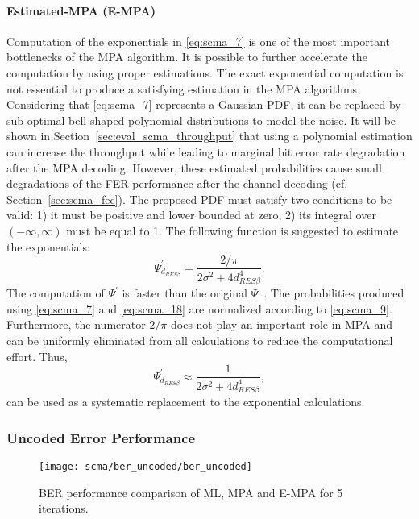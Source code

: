 \paragraph{Estimated-MPA (E-MPA)}

Computation of the exponentials in \eqref{eq:scma_7} is one of the most
important bottlenecks of the MPA algorithm. It is possible to further accelerate
the computation by using proper estimations. The exact exponential computation
is not essential to produce a satisfying estimation in the MPA algorithms.
Considering that \eqref{eq:scma_7} represents a Gaussian PDF, it can be replaced
by sub-optimal bell-shaped polynomial distributions to model the noise. It will
be shown in Section~\ref{sec:eval_scma_throughput} that using a
polynomial estimation can increase the throughput while leading to marginal bit
error rate degradation after the MPA decoding. However, these estimated
probabilities cause small degradations of the FER performance after the channel
decoding (cf. Section~\ref{sec:scma_fec}). The proposed PDF must satisfy two
conditions to be valid: 1) it must be positive and lower bounded at zero, 2) its
integral over $(-\infty, \infty)$ must be equal to 1. The following function is
suggested to estimate the exponentials:
\begin{equation}
  \label{eq:scma_18}
  \Psi^{'}_{d_{RES \beta}} = \frac{2 / \pi}{2\sigma^2 + 4d^4_{RES \beta}}.
\end{equation}
The computation of $\Psi^{'}$ is faster than the original
$\Psi$~\cite{Ghaffari2017}. The probabilities produced using \eqref{eq:scma_7}
and \eqref{eq:scma_18} are normalized according to \eqref{eq:scma_9}.
Furthermore, the numerator $2/\pi$ does not play an important role in MPA and
can be uniformly eliminated from all calculations to reduce the computational
effort. Thus,
\begin{equation}
  \label{eq:scma_19}
  \Psi^{'}_{d_{RES \beta}} \approx \frac{1}{2\sigma^2 + 4d^4_{RES \beta}},
\end{equation}
can be used as a systematic replacement to the exponential calculations.

\subsubsection{Uncoded Error Performance}
\label{sec:scma_perf}

\begin{figure}[htp]
  \centering
  \texttt{[image: scma/ber\_uncoded/ber\_uncoded]}
  \caption{BER performance comparison of ML, MPA and E-MPA for 5 iterations.}
  \label{plot:scma_ber_uncoded_a}
\end{figure}

